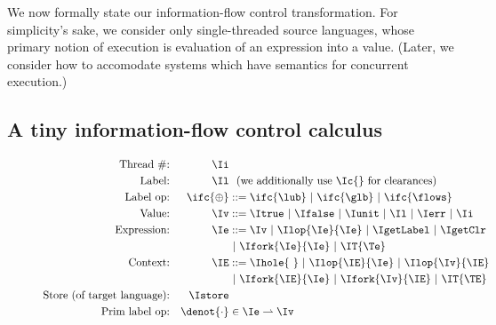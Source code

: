 {We now formally state our information-flow control transformation.  For
simplicity's sake, we consider only single-threaded source languages,
whose primary notion of execution is evaluation of an expression into a
value.  (Later, we consider how to accomodate systems which have
semantics for concurrent execution.)

\subsection{A tiny information-flow control calculus}

\begin{figure}[h]
\begin{align*}
\textrm{Thread \#:}   && \Ii          &   \\
\textrm{Label:}       && \Il          & \ \ \text{(we additionally use \Ic{} for clearances)}  \\
\textrm{Label op:}    && \ifc{\oplus} & ::=  \ifc{\lub}
                                        \ |\ \ifc{\glb}
                                        \ |\ \ifc{\flows}\\
\textrm{Value:}       && \Iv          & ::=  \Itrue 
                                        \ |\ \Ifalse
                                        \ |\ \Iunit
                                        \ |\ \Il
                                        \ |\ \Ierr
                                        \ |\ \Ii\\
\textrm{Expression:}  && \Ie          & ::=  \Iv
                                        \ |\ \Ilop{\Ie}{\Ie}
                                        \ |\ \IgetLabel
                                        \ |\ \IgetClr\\&&&
                                        \ |\ \Ifork{\Ie}{\Ie}
                                        \ |\ \IT{\Te}\\
\textrm{Context:}     && \IE          & ::=  \Ihole{\ }
                                        \ |\ \Ilop{\IE}{\Ie}
                                        \ |\ \Ilop{\Iv}{\IE}\\&&&
                                        \ |\ \Ifork{\IE}{\Ie}
                                        \ |\ \Ifork{\Iv}{\IE}
                                        \ |\ \IT{\TE}\\
\textrm{Store (of target language):} && \Istore\\
\textrm{Prim label op:} && \denot{\cdot}   & \in \Ie \rightharpoonup \Iv \\
\end{align*}
\begin{mathpar}


\end{mathpar}
\end{figure}}
